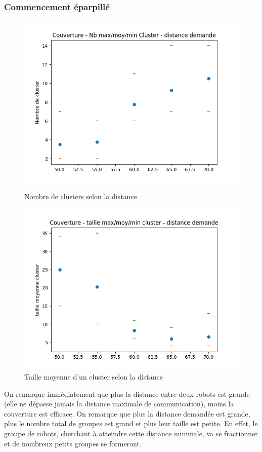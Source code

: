 \documentclass[a4paper]{article}
\begin{document}
\subsubsection{Commencement éparpillé}
\begin{figure}[h]
	\begin{minipage}[c]{.46\linewidth}
		\centering
		\includegraphics[width=1.1\linewidth]{../../script_results/Couverture_average_robot.png}
		\caption{Nombre de clusters selon la distance}
	\end{minipage}
	\hfill%
	\begin{minipage}[c]{.46\linewidth}
		\centering
		\includegraphics[width=1.1\linewidth]{../../script_results/Couverture_taille_cluster.png}
		\caption{Taille moyenne d'un cluster selon la distance}
	\end{minipage}
\end{figure}
On remarque immédiatement que plus la distance entre deux robots est grande (elle ne dépasse jamais la distance maximale de communication), moins la couverture est efficace. On remarque que plus la distance demandée est grande, plus le nombre total de groupes est grand et plus leur taille est petite. En effet, le groupe de robots, cherchant à atteindre cette distance minimale, va se fractionner et de nombreux petits groupes se formeront. 
\end{document}
